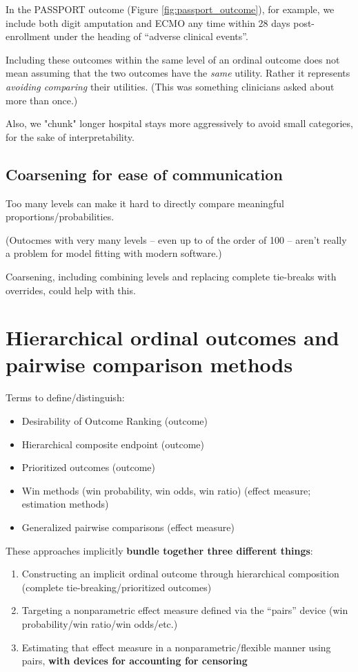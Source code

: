 \documentclass[
  11pt,
  fleqn
]{article}
\begin{document}
In the PASSPORT outcome (Figure \ref{fig:passport_outcome}), for
example, we include both digit
amputation and ECMO
any time within 28 days post-enrollment under the heading of
``adverse clinical events''.

Including these outcomes within the same level of an
ordinal outcome does not mean assuming that the two outcomes have the
\emph{same} utility. Rather it represents \emph{avoiding comparing}
their utilities. (This was something clinicians asked about more than once.)

Also, we "chunk" longer hospital stays more aggressively to avoid
small categories, for the sake of interpretability.

\subsection{Coarsening for ease of communication}

Too many levels can make it hard to directly compare meaningful
proportions/probabilities.

(Outocmes with very many levels -- even up to of the order of 100 --
aren't really a problem for model fitting with modern software.)

Coarsening, including combining levels and replacing complete
tie-breaks with overrides, could help with this.

\section{Hierarchical ordinal outcomes and pairwise comparison methods}

Terms to define/distinguish:
\begin{itemize}
  \item Desirability of Outcome Ranking (outcome)
  \item Hierarchical composite endpoint (outcome)
  \item Prioritized outcomes (outcome)
  \item Win methods (win probability, win odds, win ratio) (effect
    measure; estimation methods)
  \item Generalized pairwise comparisons (effect measure)
\end{itemize}

These approaches implicitly \textbf{bundle together three different things}:
\begin{enumerate}
  \item Constructing an implicit ordinal outcome through
    hierarchical composition (complete tie-breaking/prioritized outcomes)
  \item
    Targeting a nonparametric effect measure defined via the
    ``pairs'' device (win
    probability/win ratio/win odds/etc.)
  \item Estimating that effect measure in a
    nonparametric/flexible manner using pairs, \textbf{with devices for
    accounting for censoring}
\end{enumerate}
\end{document}
